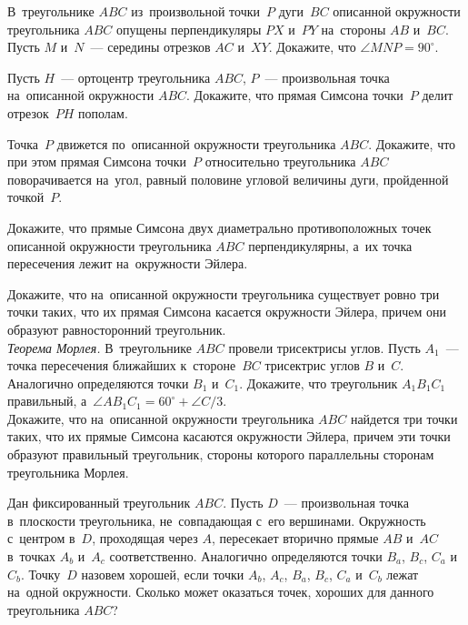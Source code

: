 \begin{problems}

\item
В~треугольнике $ABC$ из~произвольной точки~$P$ дуги~$BC$ описанной окружности
треугольника $ABC$ опущены перпендикуляры $PX$ и~$PY$ на~стороны $AB$ и~$BC$.
Пусть $M$ и~$N$~--- середины отрезков $AC$ и~$XY$.
Докажите, что $\angle MNP = 90^{\circ}$.

\item
Пусть $H$~--- ортоцентр треугольника $ABC$, $P$~--- произвольная точка
на~описанной окружности $ABC$.
Докажите, что прямая Симсона точки~$P$ делит отрезок~$PH$ пополам.

\item
\subproblem
Точка~$P$ движется по~описанной окружности треугольника $ABC$.
Докажите, что при этом прямая Симсона точки~$P$ относительно треугольника $ABC$
поворачивается на~угол, равный половине угловой величины дуги, пройденной
точкой~$P$.

\subproblem
Докажите, что прямые Симсона двух диаметрально противоположных точек описанной
окружности треугольника $ABC$ перпендикулярны, а~их точка пересечения лежит
на~окружности Эйлера.

\item
\subproblem
Докажите, что на~описанной окружности треугольника существует ровно три точки
таких, что их прямая Симсона касается окружности Эйлера, причем они образуют
равносторонний треугольник.
\\
\subproblem \emph{Теорема Морлея.}
В~треугольнике $ABC$ провели трисектрисы углов.
Пусть $A_1$~--- точка пересечения ближайших к~стороне~$BC$ трисектрис
углов $B$ и~$C$.
Аналогично определяются точки $B_1$ и~$C_1$.
Докажите, что треугольник $A_1 B_1 C_1$ правильный,
а~$\angle A B_1 C_1 = 60^{\circ} + \angle C / 3$.
\\
\subproblem
Докажите, что на~описанной окружности треугольника $ABC$ найдется три точки
таких, что их прямые Симсона касаются окружности Эйлера, причем эти точки
образуют правильный треугольник, стороны которого параллельны сторонам
треугольника Морлея.

\item
Дан фиксированный треугольник $ABC$.
Пусть $D$~--- произвольная точка в~плоскости треугольника, не~совпадающая с~его
вершинами.
Окружность с~центром в~$D$, проходящая через $A$, пересекает вторично прямые
$AB$ и~$AC$ в~точках $A_{b}$ и~$A_{c}$ соответственно.
Аналогично определяются точки $B_{a}$, $B_{c}$, $C_{a}$ и~$C_{b}$.
Точку~$D$ назовем хорошей, если точки
$A_{b}$, $A_{c}$, $B_{a}$, $B_{c}$, $C_{a}$ и~$C_{b}$
лежат на~одной окружности.
Сколько может оказаться точек, хороших для данного треугольника $ABC$?

\end{problems}

